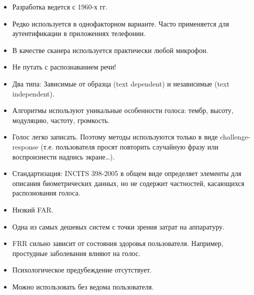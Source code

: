 \begin{frame}[allowframebreaks]
\begin{itemize}
    \item Разработка ведется с 1960-х гг.
    \item Редко используется в однофакторном варианте. Часто применяется для аутентификации в приложениях телефонии.
    \item В качестве сканера используется практически любой микрофон.
    \item Не путать с распознаванием речи!
    \item Два типа: Зависимые от образца (text dependent) и независимые (text independent).
    \item Алгоритмы используют уникальные особенности голоса: тембр, высоту, модуляцию, частоту, громкость.
    \item Голос легко записать. Поэтому методы используются только в виде challenge-response (т.е. пользователя просят повторить случайную фразу или воспроизнести надпись экране\ldots).
    \item Стандартизация: INCITS 398-2005 в общем виде определяет элементы для описания биометрических данных, но не содержит частностей, касающихся распознования голоса.
    \item Низкий FAR.
    \item Одна из самых дешевых систем с точки зрения затрат на аппаратуру.
    \item FRR сильно зависит от состояния здоровья пользователя. Например, простудные заболевания влияют на голос.
    \item Психологическое предубеждение отсутствует.
    \item Можно использовать без ведома пользователя.
\end{itemize}
\end{frame}


